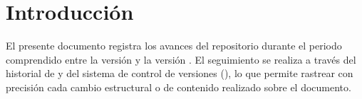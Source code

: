 
\section{Introducción}
\label{sec:introduccion}

%

El presente documento registra los avances del repositorio \texttt{\NombreRepo}
durante el periodo comprendido entre la versión \texttt{\VerRef} y la versión
\texttt{\VerActual}. El seguimiento se realiza a través del historial de
 y  del sistema de control de versiones
(), lo que permite rastrear con precisión cada cambio estructural
o de contenido realizado sobre el documento.

\lipsum[1]  %
